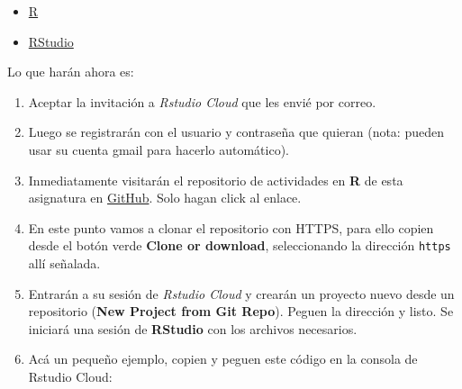 \documentclass[]{article}
\providecommand{\tightlist}{%
  \setlength{\itemsep}{0pt}\setlength{\parskip}{0pt}}
\begin{document}
\begin{itemize}
\tightlist
\item
  \href{https://www.r-project.org/}{R}
\item
  \href{https://rstudio.com/}{RStudio}
\end{itemize}

Lo que harán ahora es:

\begin{enumerate}
\def\labelenumi{\arabic{enumi}.}
\tightlist
\item
  Aceptar la invitación a \emph{Rstudio Cloud} que les envié por correo.
\item
  Luego se registrarán con el usuario y contraseña que quieran (nota:
  pueden usar su cuenta gmail para hacerlo automático).
\item
  Inmediatamente visitarán el repositorio de actividades en \textbf{R}
  de esta asignatura en
  \href{https://github.com/edlinguerra/LCA-ME}{GitHub}. Solo hagan click
  al enlace.
\item
  En este punto vamos a clonar el repositorio con HTTPS, para ello
  copien desde el botón verde \textbf{Clone or download}, seleccionando
  la dirección \texttt{https} allí señalada.
\item
  Entrarán a su sesión de \emph{Rstudio Cloud} y crearán un proyecto
  nuevo desde un repositorio (\textbf{New Project from Git Repo}).
  Peguen la dirección y listo. Se iniciará una sesión de
  \textbf{RStudio} con los archivos necesarios.\\
\item
  Acá un pequeño ejemplo, copien y peguen este código en la consola de
  Rstudio Cloud:
\end{enumerate}
\end{document}

